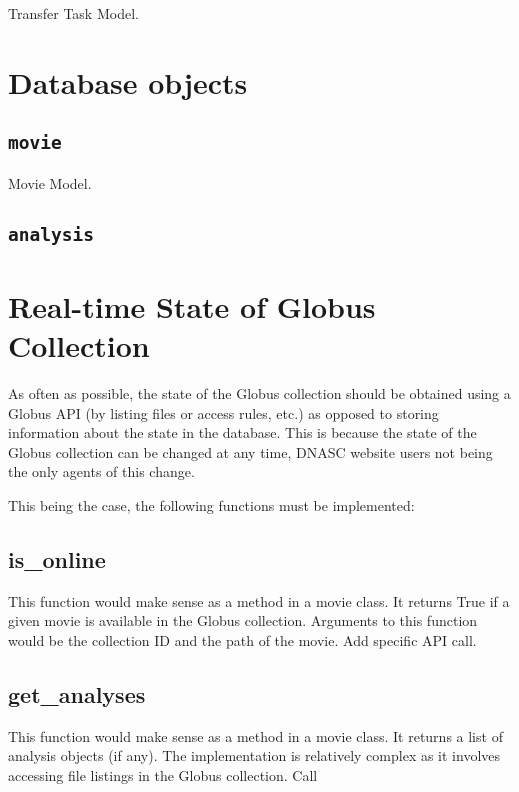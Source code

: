\begin{table}[h] %
    
    \caption{Transfer Task Model.}
\end{table}

\section{Database objects}

\subsection{\texttt{movie}}

\begin{table}[h] %
    
    \caption{Movie Model.}
\end{table}

\subsection{\texttt{analysis}}

\section{Real-time State of Globus Collection}

As often as possible, the state of the Globus collection should be obtained using a Globus API 
(by listing files or access rules, etc.) as opposed to storing information about the state in 
the database. This is because the state of the Globus collection can be changed at any time, 
DNASC website users not being the only agents of this change.

This being the case, the following functions must be implemented:

\subsection{is\_online}

This function would make sense as a method in a movie class. It returns True if a given movie 
is available in the Globus collection. Arguments to this function would be the collection ID 
and the path of the movie. Add specific API call.

\subsection{get\_analyses}

This function would make sense as a method in a movie class. It returns a list of analysis 
objects (if any). The implementation is relatively complex as it involves accessing file 
listings in the Globus collection. Call 